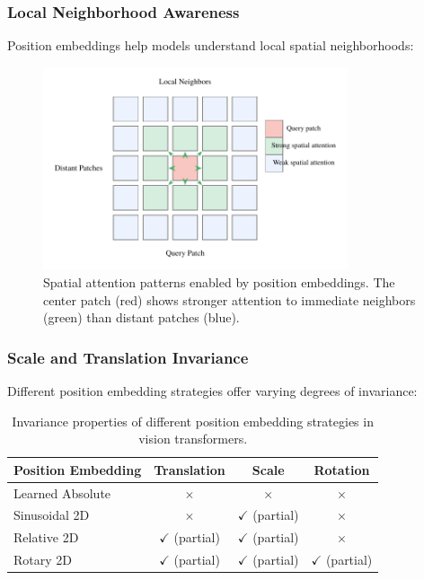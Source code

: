 \subsubsection{Local Neighborhood Awareness}

Position embeddings help models understand local spatial neighborhoods:

\begin{figure}[htbp]
\centering
\includegraphics[width=0.8\textwidth]{part2/chapter04/fig_position_attention.pdf}
\caption{Spatial attention patterns enabled by position embeddings. The center patch (red) shows stronger attention to immediate neighbors (green) than distant patches (blue).}
\end{figure}

\subsubsection{Scale and Translation Invariance}

Different position embedding strategies offer varying degrees of invariance:

\begin{table}[htbp]
\centering
\begin{tabular}{lccc}
\toprule
\textbf{Position Embedding} & \textbf{Translation} & \textbf{Scale} & \textbf{Rotation} \\
\midrule
Learned Absolute & $\times$ & $\times$ & $\times$ \\
Sinusoidal 2D & $\times$ & $\checkmark$ (partial) & $\times$ \\
Relative 2D & $\checkmark$ (partial) & $\checkmark$ (partial) & $\times$ \\
Rotary 2D & $\checkmark$ (partial) & $\checkmark$ (partial) & $\checkmark$ (partial) \\
\bottomrule
\end{tabular}
\caption{Invariance properties of different position embedding strategies in vision transformers.}
\end{table}

